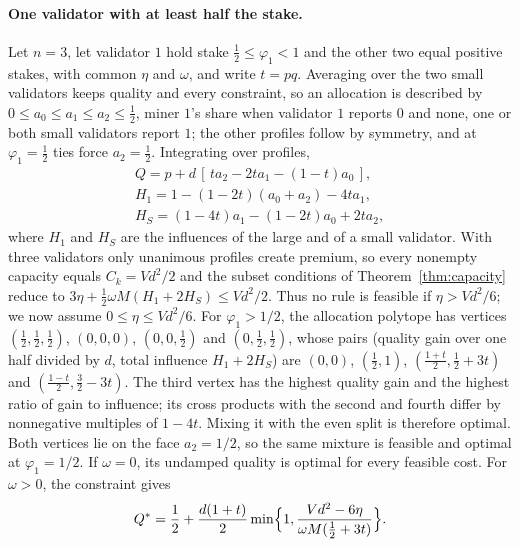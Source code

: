 \documentclass[sigconf,anonymous,review]{acmart}
\numberwithin{equation}{section}
\begin{document}
\paragraph{One validator with at least half the stake.} Let $n=3$, let
validator $1$ hold stake $\frac12\le\varphi_1<1$ and the other two equal
positive stakes, with common $\eta$ and $\omega$, and write $t=pq$. Averaging over the two small
validators keeps quality and every constraint, so an allocation is described
by $0\le a_0\le a_1\le a_2\le\frac12$, miner $1$'s share when validator $1$
reports $0$ and none, one or both small validators report $1$; the other
profiles follow by symmetry, and at $\varphi_1=\frac12$ ties force
$a_2=\frac12$. Integrating over profiles,
\begin{gather*}
Q=p+d\,[\,ta_2-2ta_1-(1-t)a_0\,],\\
H_1=1-(1-2t)(a_0+a_2)-4ta_1,\\
H_S=(1-4t)a_1-(1-2t)a_0+2ta_2,
\end{gather*}
where $H_1$ and $H_S$ are the influences of the large and of a small validator.
With three validators only unanimous profiles create premium, so every
nonempty capacity equals $C_k=Vd^2/2$ and the subset conditions of
Theorem~\ref{thm:capacity} reduce to
$3\eta+\frac12\omega M(H_1+2H_S)\le Vd^2/2$. Thus no rule is feasible
if $\eta>Vd^2/6$; we now assume $0\le\eta\le Vd^2/6$.
For $\varphi_1>1/2$, the allocation polytope has vertices $(\frac12,\frac12,\frac12)$, $(0,0,0)$, $(0,0,\frac12)$ and
$(0,\frac12,\frac12)$, whose pairs (quality gain over one half divided by $d$,
total influence $H_1+2H_S$) are $(0,0)$, $(\frac12,1)$,
$(\frac{1+t}2,\frac12+3t)$ and $(\frac{1-t}2,\frac32-3t)$. The third vertex has
the highest quality gain and the highest ratio of gain to influence; its cross
products with the second and fourth differ by nonnegative multiples of $1-4t$.
Mixing it with the even split is therefore optimal. Both vertices lie on
the face $a_2=1/2$, so the same mixture is feasible and optimal at
$\varphi_1=1/2$. If $\omega=0$, its undamped quality is optimal for every
feasible cost. For $\omega>0$, the constraint gives
\[
Q^*=\frac12+\frac{d(1+t)}2\min\Bigl\{1,\frac{Vd^2-6\eta}{\omega M(\frac12+3t)}\Bigr\}.
\]
\end{document}
